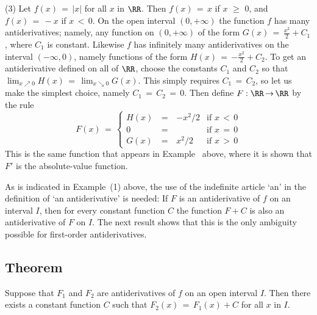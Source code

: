         (3) Let $f(x) \,=\, |x|$ for all $x$ in ${\RR}$. Then $f(x) \,=\, x$ if $x\,\,{\geq}\,\,0$, and $f(x) \,=\, -x$ if $x\,<\,0$.
    On the open interval $(0,+{\infty})$ the function $f$ has many antiderivatives; namely, any function on $(0,+{\infty})$ of the form $G(x) \,=\, {\displaystyle \frac{x^{2}}{2}+C_{1}}$,
    where $C_{1}$ is constant. Likewise $f$ has infinitely many antiderivatives on the interval $(-{\infty},0)$,
    namely functions of the form $H(x) \,=\, {\displaystyle -\frac{x^{2}}{2}+C_{2}}$.
    To get an antiderivative defined on all of ${\RR}$, choose the constants $C_{1}$ and $C_{2}$ so that $\lim_{x{\nearrow}0} H(x) \,=\, \lim_{x{\searrow}0} G(x)$.
    This simply requires $C_{1} \,=\, C_{2}$, so let us make the simplest choice, namely $C_{1} \,=\, C_{2} \,=\, 0$.
    Then define $F:{\RR} \,{\rightarrow}\, {\RR}$ by the rule
        \begin{displaymath}
        F(x) \,=\, \left\{
        \begin{array}{ccrl}
        H(x) & \,=\, & -x^{2}/2 & \mbox{if $x\,<\,0$} \\
          0  & \,=\, &          & \mbox{if $x\,=\,0$} \\
        G(x) & \,=\, &  x^{2}/2 & \mbox{if $x\,>\,0$}
        \end{array}
                        \right.
        \end{displaymath}
    This is the same function that appears in Example~ above, where it is shown that $F'$ is the absolute-value function.

\VV

        As is indicated in Example~(1) above, the use of the indefinite article `an' in the definition of `an antiderivative' is needed:
    If $F$ is an antiderivative of $f$ on an interval $I$, then for every constant function $C$ the function $F+C$ is also an antiderivative of $F$ on $I$.
    The next result shows that this is the only ambiguity possible for first-order antiderivatives.

\V

             \subsection{\small{\bf Theorem}}
            \label{ThmE45.50}

\V

        Suppose that $F_{1}$ and $F_{2}$ are antiderivatives of $f$ on an open interval $I$.
    Then there exists a constant function $C$ such that $F_{2}(x) \,=\, F_{1}(x) + C$ for all $x$ in $I$.

